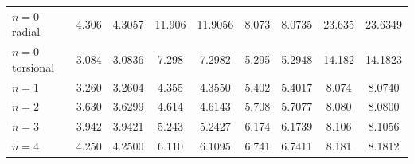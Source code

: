 \documentclass[11pt]{article}
\begin{document}
\begin{center}
\begin{longtable}{lcccccccc}
\midrule
$n=0$ radial & 4.306 & 4.3057 & 11.906 & 11.9056 & 8.073 & 8.0735 & 23.635 & 23.6349 \\
$n=0$ torsional & 3.084 & 3.0836 & 7.298 & 7.2982 & 5.295 & 5.2948 & 14.182 & 14.1823 \\
$n=1$ & 3.260 & 3.2604 & 4.355 & 4.3550 & 5.402 & 5.4017 & 8.074 & 8.0740 \\
$n=2$ & 3.630 & 3.6299 & 4.614 & 4.6143 & 5.708 & 5.7077 & 8.080 & 8.0800 \\
$n=3$ & 3.942 & 3.9421 & 5.243 & 5.2427 & 6.174 & 6.1739 & 8.106 & 8.1056 \\
$n=4$ & 4.250 & 4.2500 & 6.110 & 6.1095 & 6.741 & 6.7411 & 8.181 & 8.1812 \\
\bottomrule
\end{longtable}
\end{center}
\end{document}
